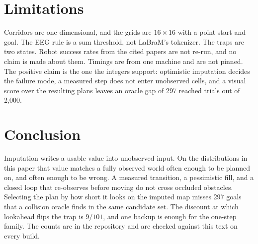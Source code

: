 \documentclass[10pt,twocolumn,letterpaper]{article}
\begin{document}
\section{Limitations}

Corridors are one-dimensional, and the grids are $16{\times}16$ with a point start and goal.
The EEG rule is a sum threshold, not LaBraM's tokenizer.
The traps are two states.
Robot success rates from the cited papers are not re-run, and no claim is made about them.
Timings are from one machine and are not pinned.
The positive claim is the one the integers support: optimistic imputation decides the failure mode, a measured step does not enter unobserved cells, and a visual score over the resulting plans leaves an oracle gap of 297 reached trials out of 2{,}000.

\section{Conclusion}

Imputation writes a usable value into unobserved input.
On the distributions in this paper that value matches a fully observed world often enough to be planned on, and often enough to be wrong.
A measured transition, a pessimistic fill, and a closed loop that re-observes before moving do not cross occluded obstacles.
Selecting the plan by how short it looks on the imputed map misses 297 goals that a collision oracle finds in the same candidate set.
The discount at which lookahead flips the trap is $9/101$, and one backup is enough for the one-step family.
The counts are in the repository and are checked against this text on every build.

{
\small


}
\end{document}
